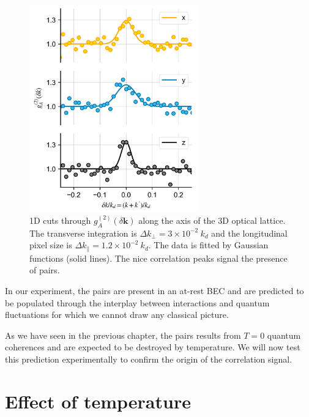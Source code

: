 \begin{figure}
    \centering
    \includegraphics[width=0.65\textwidth]{Fig/Chapter4/1d_cuts.png}
    \caption{1D cuts through $g_{A}^{(2)} (\delta {\bm k})$ along the axis of the 3D optical lattice. The transverse integration is $\Delta k_{\perp}=3 \times 10^{-2} \ k_d$ and the longitudinal pixel size is $\Delta k_{\parallel}=1.2 \times 10^{-2} \ k_d$. The data is fitted by Gaussian functions (solid lines). The nice correlation peaks signal the presence of \kmk pairs.}
    \label{fig:kmk_signal}
\end{figure}

In our experiment, the \kmk pairs are present in an at-rest BEC and are predicted to be populated through the interplay between interactions and quantum fluctuations for which we cannot draw any classical picture.

As we have seen in the previous chapter, the \kmk pairs results from $T=0$ quantum coherences and are expected to be destroyed by temperature. We will now test this prediction experimentally to confirm the origin of the correlation signal.

\section{Effect of temperature}

